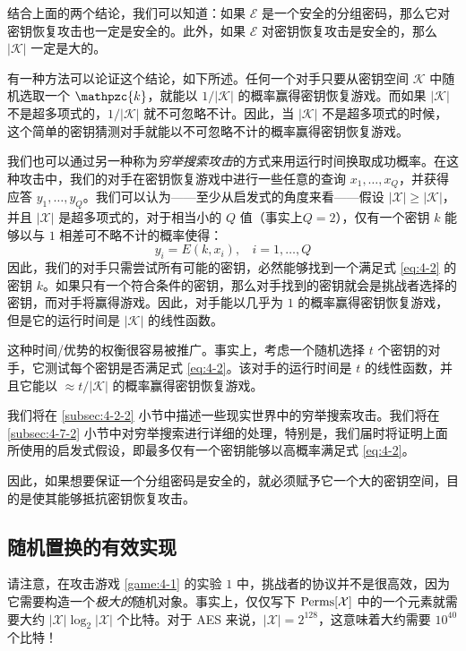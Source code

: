 结合上面的两个结论，我们可以知道：如果 $\mathcal{E}$ 是一个安全的分组密码，那么它对密钥恢复攻击也一定是安全的。此外，如果 $\mathcal{E}$ 对密钥恢复攻击是安全的，那么 $|\mathcal{K}|$ 一定是大的。

有一种方法可以论证这个结论，如下所述。任何一个对手只要从密钥空间 $\mathcal{K}$ 中随机选取一个 $\mathpzc{k}$，就能以 ${1}/{|\mathcal{K}|}$ 的概率赢得密钥恢复游戏。而如果 $|\mathcal{K}|$ 不是超多项式的，${1}/{|\mathcal{K}|}$ 就不可忽略不计。因此，当 $|\mathcal{K}|$ 不是超多项式的时候，这个简单的密钥猜测对手就能以不可忽略不计的概率赢得密钥恢复游戏。

我们也可以通过另一种称为\emph{穷举搜索攻击}的方式来用运行时间换取成功概率。在这种攻击中，我们的对手在密钥恢复游戏中进行一些任意的查询 $x_1,\dots,x_Q$，并获得应答 $y_1,\dots,y_Q$。我们可以认为——至少从启发式的角度来看——假设 $|\mathcal{X}|\geq|\mathcal{K}|$，并且 $|\mathcal{X}|$ 是超多项式的，对于相当小的 $Q$ 值（事实上$Q=2$），仅有一个密钥 $k$ 能够以与 $1$ 相差可不略不计的概率使得：
\begin{equation}\label{eq:4-2}
y_i=E(k,x_i),~~~~
i=1,\dots,Q
\end{equation}
因此，我们的对手只需尝试所有可能的密钥，必然能够找到一个满足式 \ref{eq:4-2} 的密钥 $k$。如果只有一个符合条件的密钥，那么对手找到的密钥就会是挑战者选择的密钥，而对手将赢得游戏。因此，对手能以几乎为 $1$ 的概率赢得密钥恢复游戏，但是它的运行时间是 $|\mathcal{K}|$ 的线性函数。

这种时间/优势的权衡很容易被推广。事实上，考虑一个随机选择 $t$ 个密钥的对手，它测试每个密钥是否满足式 \ref{eq:4-2}。该对手的运行时间是 $t$ 的线性函数，并且它能以 $\approx{t}/{|\mathcal{K}|}$ 的概率赢得密钥恢复游戏。

我们将在 \ref{subsec:4-2-2} 小节中描述一些现实世界中的穷举搜索攻击。我们将在 \ref{subsec:4-7-2} 小节中对穷举搜索进行详细的处理，特别是，我们届时将证明上面所使用的启发式假设，即最多仅有一个密钥能够以高概率满足式 \ref{eq:4-2}。

因此，如果想要保证一个分组密码是安全的，就必须赋予它一个大的密钥空间，目的是使其能够抵抗密钥恢复攻击。

\subsection{随机置换的有效实现}\label{subsec:4-1-2}

请注意，在攻击游戏 \ref{game:4-1} 的实验 $1$ 中，挑战者的协议并不是很高效，因为它需要构造一个\emph{极大的}随机对象。事实上，仅仅写下 ${\rm Perms}[\mathcal{X}]$ 中的一个元素就需要大约 $|\mathcal{X}|\log_2|\mathcal{X}|$ 个比特。对于 AES 来说，$|\mathcal{X}|=2^{128}$，这意味着大约需要 $10^{40}$ 个比特！

